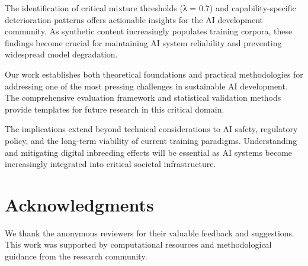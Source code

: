 \documentclass{article}
\begin{document}
The identification of critical mixture thresholds (λ = 0.7) and capability-specific deterioration patterns offers actionable insights for the AI development community. As synthetic content increasingly populates training corpora, these findings become crucial for maintaining AI system reliability and preventing widespread model degradation.

Our work establishes both theoretical foundations and practical methodologies for addressing one of the most pressing challenges in sustainable AI development. The comprehensive evaluation framework and statistical validation methods provide templates for future research in this critical domain.

The implications extend beyond technical considerations to AI safety, regulatory policy, and the long-term viability of current training paradigms. Understanding and mitigating digital inbreeding effects will be essential as AI systems become increasingly integrated into critical societal infrastructure.

\section*{Acknowledgments}

We thank the anonymous reviewers for their valuable feedback and suggestions. This work was supported by computational resources and methodological guidance from the research community.



\end{document}

